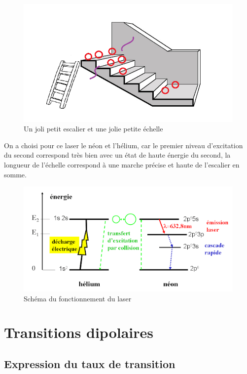 \begin{figure}[htp]
    \centering
    \includegraphics[scale=1.0]{Images2/Escalier 1.png}
    \caption{Un joli petit escalier et une jolie petite échelle}
    \label{fig:Analogie}
\end{figure}
On a choisi pour ce laser le néon et l'hélium, car le premier niveau d'excitation du second correspond très bien avec un état de haute énergie du second, la longueur de l'échelle correspond à une marche précise et haute de l'escalier en somme.\\
\begin{figure}[htp]
    \centering
    \includegraphics[scale=0.8]{Images2/hélium-néon.png}
    \caption{Schéma du fonctionnement du laser}
    \label{fig:schema_helium-neon}
\end{figure}



\newpage
\section{Transitions dipolaires}
\subsection{Expression du taux de transition}



